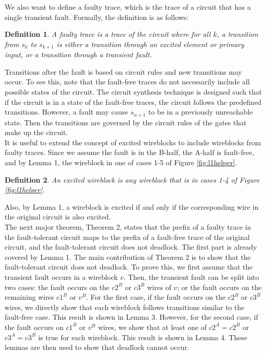 \documentclass[12pt]{report}
\newtheorem*{definition}{Definition}
\begin{document}
We also want to define a faulty trace, which is the trace of a circuit that has a single transient fault.  Formally, the definition is as follows:
\begin{definition}
A {\em faulty trace} is a trace of the circuit where for all $k$, a transition from $s_k$ to $s_{k+1}$ is either a transition through an excited element or primary input, or a transition through a transient fault.
\end{definition}
Transitions after the fault is based on circuit rules and new transitions may occur.  To see this, note that the fault-free traces do not necessarily include all possible states of the circuit.  The circuit synthesis technique is designed such that if the circuit is in a state of the fault-free traces, the circuit follows the predefined transitions.  However, a fault may cause $s_{n+1}$ to be in a previously unreachable state.  Then the transitions are governed by the circuit rules of the gates that make up the circuit.\\ %

It is useful to extend the concept of excited wireblocks to include wireblocks from faulty traces.  Since we assume the fault is in the B-half, the A-half is fault-free, and by Lemma 1, the wireblock in one of cases 1-5 of Figure \ref{fig:l1helper}.  
\begin{definition}
An {\em excited wireblock} is any wireblock that is in cases 1-4 of Figure \ref{fig:l1helper}.  
\end{definition}
Also, by Lemma 1, a wireblock is excited if and only if the corresponding wire in the original circuit is also excited.\\

The next major theorem, Theorem 2, states that the prefix of a faulty trace in the fault-tolerant circuit maps to the prefix of a fault-free trace of the original circuit, and the fault-tolerant circuit does not deadlock.  The first part is already covered by Lemma 1.  The main contribution of Theorem 2 is to show that the fault-tolerant circuit does not deadlock.  To prove this, we first assume that the transient fault occurs in a wireblock $v$.  Then, the transient fault can be split into two cases: the fault occurs on the $c2^B$ or $c3^B$ wires of $v$; or the fault occurs on the remaining wires $c1^B$ or $v^B$.  For the first case, if the fault occurs on the $c2^B$ or $c3^B$ wires, we directly show that each wireblock follows transitions similar to the fault-free case. This result is shown in Lemma 3.  However, for the second case, if the fault occurs on $c1^B$ or $v^B$ wires, we show that at least one of $c2^A=c2^B$ or $c3^A=c3^B$ is true for each wireblock.  This result is shown in Lemma 4.  These lemmas are then used to show that deadlock cannot occur.\\
\end{document}
